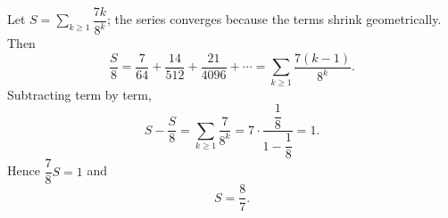 Let $S=\displaystyle\sum_{k\ge1}\dfrac{7k}{8^k}$; the series converges because the terms shrink geometrically. Then
\[
\dfrac{S}{8}=\dfrac{7}{64}+\dfrac{14}{512}+\dfrac{21}{4096}+\cdots=\sum_{k\ge1}\dfrac{7(k-1)}{8^k}.
\]
Subtracting term by term,
\[
S-\dfrac {S}{8}=\sum_{k\ge1}\dfrac{7}{8^k}=7\cdot\dfrac{\dfrac{1}{8}}{1-\dfrac{1}{8}}=1 .
\]
Hence $\dfrac{7}{8}S=1$ and
\[
S=\boxed{\dfrac{8}{7}}.
\]

